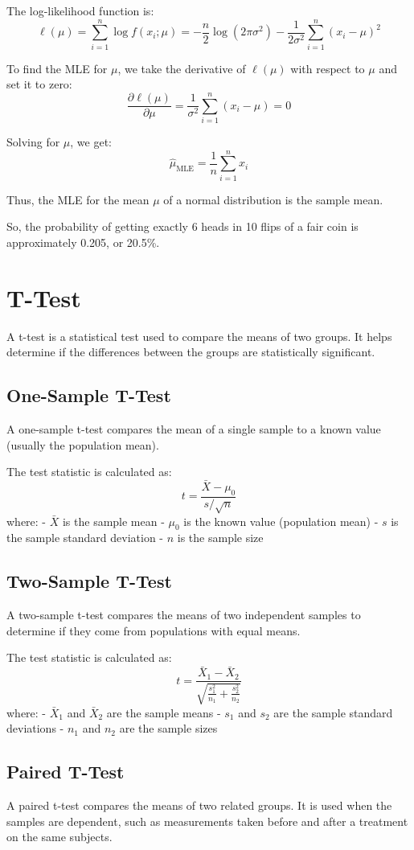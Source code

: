 \documentclass{article}
\begin{document}
The log-likelihood function is:
\[
\ell(\mu) = \sum_{i=1}^{n} \log f(x_i; \mu) = -\frac{n}{2} \log(2\pi\sigma^2) - \frac{1}{2\sigma^2} \sum_{i=1}^{n} (x_i - \mu)^2
\]

To find the MLE for \(\mu\), we take the derivative of \(\ell(\mu)\) with respect to \(\mu\) and set it to zero:
\[
\frac{\partial \ell(\mu)}{\partial \mu} = \frac{1}{\sigma^2} \sum_{i=1}^{n} (x_i - \mu) = 0
\]

Solving for \(\mu\), we get:
\[
\hat{\mu}_{\text{MLE}} = \frac{1}{n} \sum_{i=1}^{n} x_i
\]

Thus, the MLE for the mean \(\mu\) of a normal distribution is the sample mean.

So, the probability of getting exactly 6 heads in 10 flips of a fair coin is approximately 0.205, or 20.5\%.

\section{T-Test}
A t-test is a statistical test used to compare the means of two groups. It helps determine if the differences between the groups are statistically significant.

\subsection{One-Sample T-Test}
A one-sample t-test compares the mean of a single sample to a known value (usually the population mean).

The test statistic is calculated as:
\[
t = \frac{\bar{X} - \mu_0}{s / \sqrt{n}}
\]
where:
- \(\bar{X}\) is the sample mean
- \(\mu_0\) is the known value (population mean)
- \(s\) is the sample standard deviation
- \(n\) is the sample size

\subsection{Two-Sample T-Test}
A two-sample t-test compares the means of two independent samples to determine if they come from populations with equal means.

The test statistic is calculated as:
\[
t = \frac{\bar{X}_1 - \bar{X}_2}{\sqrt{\frac{s_1^2}{n_1} + \frac{s_2^2}{n_2}}}
\]
where:
- \(\bar{X}_1\) and \(\bar{X}_2\) are the sample means
- \(s_1\) and \(s_2\) are the sample standard deviations
- \(n_1\) and \(n_2\) are the sample sizes

\subsection{Paired T-Test}
A paired t-test compares the means of two related groups. It is used when the samples are dependent, such as measurements taken before and after a treatment on the same subjects.
\end{document}
